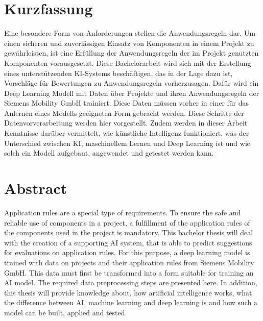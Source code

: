\section*{Kurzfassung}
Eine besondere Form von Anforderungen stellen die Anwendungsregeln dar. Um einen sicheren und zuverlässigen Einsatz von Komponenten in einem Projekt zu gewährleisten,
ist eine Erfüllung der Anwendungsregeln der im Projekt genutzten Komponenten vorausgesetzt. Diese Bachelorarbeit wird sich mit der Erstellung eines unterstützenden KI-Systems beschäftigen,
das in der Lage dazu ist, Vorschläge für Bewertungen zu Anwendungsregeln vorherzusagen. Dafür wird ein Deep Learning Modell mit Daten über Projekte und 
ihren Anwendungsregeln der Siemens Mobility GmbH trainiert. Diese Daten müssen vorher in einer für das Anlernen eines Modells geeigneten Form 
gebracht werden. Diese Schritte der Datenvorverarbeitung werden hier vorgestellt. Zudem werden in dieser Arbeit Kenntnisse darüber vermittelt, 
wie künstliche Intelligenz funktioniert, was der Unterschied zwischen KI, maschinellem Lernen und Deep Learning ist und wie solch ein Modell aufgebaut, angewendet und getestet werden kann. 

\vfill\vfill\vfill\vfill\vfill\vfill
\section*{Abstract}
Application rules are a special type of requirements. To ensure the safe and reliable use of components in a project,
a fulfillment of the application rules of the components used in the project is mandatory. This bachelor thesis will deal with the creation of a supporting AI system,
that is able to predict suggestions for evaluations on application rules. For this purpose, a deep learning model is trained with data on projects and 
their application rules from Siemens Mobility GmbH. This data must first be transformed into a form suitable for training an AI model. 
The required data preprocessing steps are presented here. In addition, this thesis will provide knowledge about, 
how artificial intelligence works, what the difference between AI, machine learning and deep learning is and how such a model can be built, applied and tested.
\vfill\vfill\vfill\vfill\vfill\vfill